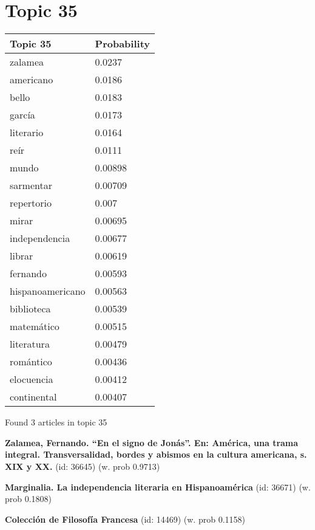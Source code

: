 \documentclass{article}
\begin{document}
\section*{Topic 35}\vfill
\begin{tabular}{ll}
\toprule
         Topic 35 & Probability \\
\midrule
          zalamea &      0.0237 \\
        americano &      0.0186 \\
            bello &      0.0183 \\
           garcía &      0.0173 \\
        literario &      0.0164 \\
             reír &      0.0111 \\
            mundo &     0.00898 \\
        sarmentar &     0.00709 \\
       repertorio &       0.007 \\
            mirar &     0.00695 \\
    independencia &     0.00677 \\
           librar &     0.00619 \\
         fernando &     0.00593 \\
 hispanoamericano &     0.00563 \\
       biblioteca &     0.00539 \\
       matemático &     0.00515 \\
       literatura &     0.00479 \\
        romántico &     0.00436 \\
       elocuencia &     0.00412 \\
      continental &     0.00407 \\
\bottomrule
\end{tabular}

\vfill
Found 3 articles in topic 35
\vfill

\textbf{Zalamea, Fernando. “En el signo de Jonás”. En: América, una trama integral. Transversalidad, bordes y abismos en la cultura americana, s. XIX y XX.} (id: 36645)
 (w. prob 0.9713)
\vfill

\textbf{Marginalia. La independencia literaria en Hispanoamérica} (id: 36671)
 (w. prob 0.1808)
\vfill

\textbf{Colección de Filosofía Francesa} (id: 14469)
 (w. prob 0.1158)

\vfill
\newpage


\centering
\thispagestyle{empty}
\end{document}
